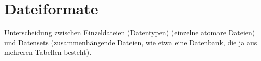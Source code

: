 \documentclass[a4paper]{report}
\begin{document}
\chapter{Dateiformate}
Unterscheidung zwischen Einzeldateien (Datentypen) (einzelne atomare Dateien) und Datensets (zusammenhängende Dateien, wie etwa eine Datenbank, die ja aus mehreren Tabellen besteht). 

	
%	

%
%
%
%
%
%
%
%
\end{document}
